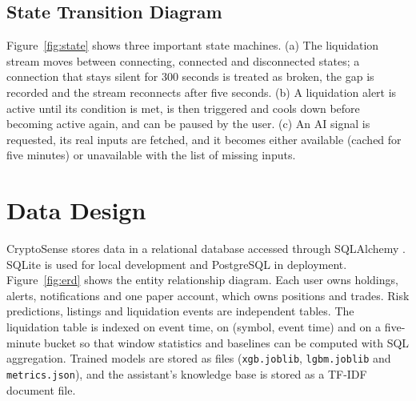 
\subsection{State Transition Diagram}
Figure~\ref{fig:state} shows three important state machines. (a) The liquidation stream moves between connecting, connected and disconnected states; a connection that stays silent for 300 seconds is treated as broken, the gap is recorded and the stream reconnects after five seconds. (b) A liquidation alert is active until its condition is met, is then triggered and cools down before becoming active again, and can be paused by the user. (c) An AI signal is requested, its real inputs are fetched, and it becomes either available (cached for five minutes) or unavailable with the list of missing inputs.


\section{Data Design}
CryptoSense stores data in a relational database accessed through SQLAlchemy \cite{sqlalchemy}. SQLite is used for local development and PostgreSQL in deployment. Figure~\ref{fig:erd} shows the entity relationship diagram. Each user owns holdings, alerts, notifications and one paper account, which owns positions and trades. Risk predictions, listings and liquidation events are independent tables. The liquidation table is indexed on event time, on (symbol, event time) and on a five-minute bucket so that window statistics and baselines can be computed with SQL aggregation. Trained models are stored as files (\texttt{xgb.joblib}, \texttt{lgbm.joblib} and \texttt{metrics.json}), and the assistant's knowledge base is stored as a TF-IDF document file.


